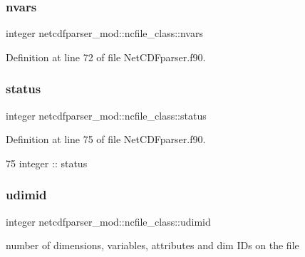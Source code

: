 \subsubsection{\texorpdfstring{nvars}{nvars}}
{\footnotesize\ttfamily integer netcdfparser\+\_\+mod\+::ncfile\+\_\+class\+::nvars\hspace{0.3cm}{\ttfamily [private]}}



Definition at line 72 of file Net\+C\+D\+Fparser.\+f90.

\mbox{\label{structnetcdfparser__mod_1_1ncfile__class_ad5ca70c79d7fb287890f7c0cda5a222c}} 
\subsubsection{\texorpdfstring{status}{status}}
{\footnotesize\ttfamily integer netcdfparser\+\_\+mod\+::ncfile\+\_\+class\+::status\hspace{0.3cm}{\ttfamily [private]}}



Definition at line 75 of file Net\+C\+D\+Fparser.\+f90.


\begin{DoxyCode}
75         \textcolor{keywordtype}{integer} :: status
\end{DoxyCode}
\mbox{\label{structnetcdfparser__mod_1_1ncfile__class_a4ecd4e68d99de349ac131df9572b5738}} 
\subsubsection{\texorpdfstring{udimid}{udimid}}
{\footnotesize\ttfamily integer netcdfparser\+\_\+mod\+::ncfile\+\_\+class\+::udimid\hspace{0.3cm}{\ttfamily [private]}}



number of dimensions, variables, attributes and dim I\+Ds on the file 



